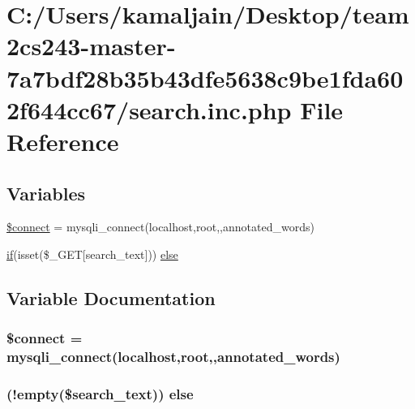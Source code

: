\hypertarget{search_8inc_8php}{}\section{C\+:/\+Users/kamaljain/\+Desktop/team2cs243-\/master-\/7a7bdf28b35b43dfe5638c9be1fda602f644cc67/search.inc.\+php File Reference}
\label{search_8inc_8php}
\subsection*{Variables}
\begin{DoxyCompactItemize}
\item 
\hyperlink{search_8inc_8php_a956617395b85e98d907df712f6d0d3f7}{\$connect} = mysqli\+\_\+connect(\textquotesingle{}localhost\textquotesingle{},\textquotesingle{}root\textquotesingle{},\textquotesingle{}\textquotesingle{},\textquotesingle{}annotated\+\_\+words\textquotesingle{})
\item 
\hyperlink{login_8php_a6cf3ef86567b2d2e235730bbe61cb311}{if}(isset(\$\+\_\+\+G\+ET\mbox{[}\textquotesingle{}search\+\_\+text\textquotesingle{}\mbox{]})) \hyperlink{search_8inc_8php_ab88b46cb725967f301070fd8d91ad9bc}{else}
\end{DoxyCompactItemize}


\subsection{Variable Documentation}
\subsubsection[{\texorpdfstring{\$connect}{$connect}}]{\setlength{\rightskip}{0pt plus 5cm}\$connect = mysqli\+\_\+connect(\textquotesingle{}localhost\textquotesingle{},\textquotesingle{}root\textquotesingle{},\textquotesingle{}\textquotesingle{},\textquotesingle{}annotated\+\_\+words\textquotesingle{})}\hypertarget{search_8inc_8php_a956617395b85e98d907df712f6d0d3f7}{}\label{search_8inc_8php_a956617395b85e98d907df712f6d0d3f7}
\subsubsection[{\texorpdfstring{else}{else}}]{ (!empty(\$search\+\_\+text)) else}\hypertarget{search_8inc_8php_ab88b46cb725967f301070fd8d91ad9bc}{}\label{search_8inc_8php_ab88b46cb725967f301070fd8d91ad9bc}
